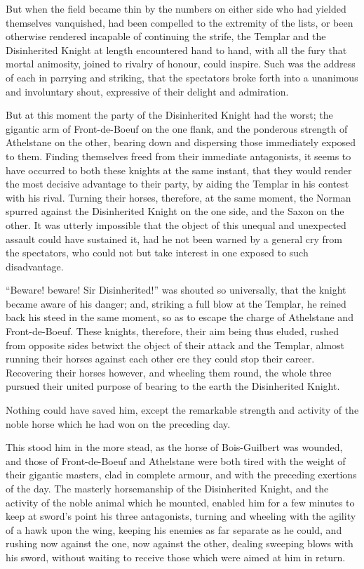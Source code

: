 But when the field became thin by the numbers on either side who had
yielded themselves vanquished, had been compelled to the extremity of
the lists, or been otherwise rendered incapable of continuing the
strife, the Templar and the Disinherited Knight at length encountered
hand to hand, with all the fury that mortal animosity, joined to rivalry
of honour, could inspire. Such was the address of each in parrying and
striking, that the spectators broke forth into a unanimous and
involuntary shout, expressive of their delight and admiration.

But at this moment the party of the Disinherited Knight had the worst;
the gigantic arm of Front-de-Boeuf on the one flank, and the ponderous
strength of Athelstane on the other, bearing down and dispersing those
immediately exposed to them. Finding themselves freed from their
immediate antagonists, it seems to have occurred to both these knights
at the same instant, that they would render the most decisive advantage
to their party, by aiding the Templar in his contest with his rival.
Turning their horses, therefore, at the same moment, the Norman spurred
against the Disinherited Knight on the one side, and the Saxon on the
other. It was utterly impossible that the object of this unequal and
unexpected assault could have sustained it, had he not been warned by a
general cry from the spectators, who could not but take interest in one
exposed to such disadvantage.

``Beware! beware! Sir Disinherited!'' was shouted so universally, that
the knight became aware of his danger; and, striking a full blow at the
Templar, he reined back his steed in the same moment, so as to escape
the charge of Athelstane and Front-de-Boeuf. These knights, therefore,
their aim being thus eluded, rushed from opposite sides betwixt the
object of their attack and the Templar, almost running their horses
against each other ere they could stop their career. Recovering their
horses however, and wheeling them round, the whole three pursued their
united purpose of bearing to the earth the Disinherited Knight.

Nothing could have saved him, except the remarkable strength and
activity of the noble horse which he had won on the preceding day.

This stood him in the more stead, as the horse of Bois-Guilbert was
wounded, and those of Front-de-Boeuf and Athelstane were both tired with
the weight of their gigantic masters, clad in complete armour, and with
the preceding exertions of the day. The masterly horsemanship of the
Disinherited Knight, and the activity of the noble animal which he
mounted, enabled him for a few minutes to keep at sword's point his
three antagonists, turning and wheeling with the agility of a hawk upon
the wing, keeping his enemies as far separate as he could, and rushing
now against the one, now against the other, dealing sweeping blows with
his sword, without waiting to receive those which were aimed at him in
return.

